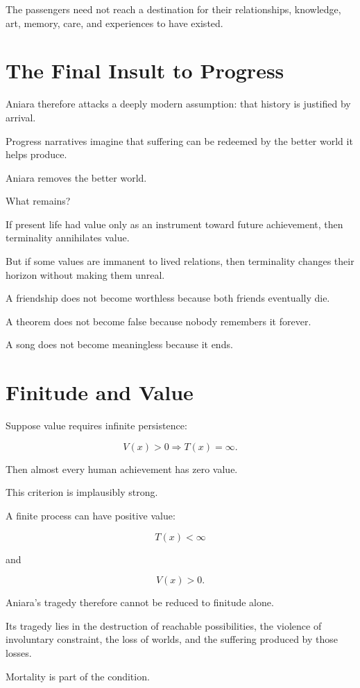 \documentclass[11pt,oneside]{book}
\theoremstyle{definition}
\theoremstyle{remark}
\begin{document}
The passengers need not reach a destination for their relationships, knowledge, art, memory, care, and experiences to have existed.

\section{The Final Insult to Progress}

Aniara therefore attacks a deeply modern assumption: that history is justified by arrival.

Progress narratives imagine that suffering can be redeemed by the better world it helps produce.

Aniara removes the better world.

What remains?

If present life had value only as an instrument toward future achievement, then terminality annihilates value.

But if some values are immanent to lived relations, then terminality changes their horizon without making them unreal.

A friendship does not become worthless because both friends eventually die.

A theorem does not become false because nobody remembers it forever.

A song does not become meaningless because it ends.

\section{Finitude and Value}

Suppose value requires infinite persistence:

\[
V(x)>0
\Rightarrow
T(x)=\infty.
\]

Then almost every human achievement has zero value.

This criterion is implausibly strong.

A finite process can have positive value:

\[
T(x)<\infty
\]

and

\[
V(x)>0.
\]

Aniara's tragedy therefore cannot be reduced to finitude alone.

Its tragedy lies in the destruction of reachable possibilities, the violence of involuntary constraint, the loss of worlds, and the suffering produced by those losses.

Mortality is part of the condition.
\end{document}
